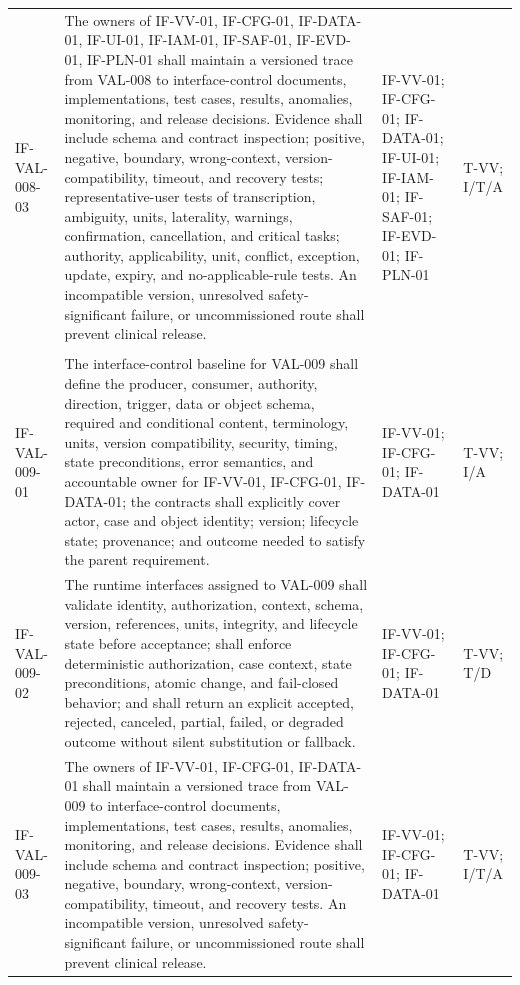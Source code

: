 \documentclass[11pt,letterpaper]{article}
\begin{document}
\begin{scriptsize}
\begin{longtable}{@{}L{0.14\textwidth}L{0.49\textwidth}L{0.19\textwidth}L{0.10\textwidth}@{}}
\addlinespace[2pt]
\mbox{IF-VAL-008-03} & The owners of IF-VV-01, IF-CFG-01, IF-DATA-01, IF-UI-01, IF-IAM-01, IF-SAF-01, IF-EVD-01, IF-PLN-01 shall maintain a versioned trace from VAL-008 to interface-control documents, implementations, test cases, results, anomalies, monitoring, and release decisions. Evidence shall include schema and contract inspection; positive, negative, boundary, wrong-context, version-compatibility, timeout, and recovery tests; representative-user tests of transcription, ambiguity, units, laterality, warnings, confirmation, cancellation, and critical tasks; authority, applicability, unit, conflict, exception, update, expiry, and no-applicable-rule tests. An incompatible version, unresolved safety-significant failure, or uncommissioned route shall prevent clinical release. & IF-VV-01; IF-CFG-01; IF-DATA-01; IF-UI-01; IF-IAM-01; IF-SAF-01; IF-EVD-01; IF-PLN-01 & T-VV; I\slash\allowbreak{}T\slash\allowbreak{}A \\
\addlinespace[2pt]
 \\
\addlinespace[2pt]
\mbox{IF-VAL-009-01} & The interface-control baseline for VAL-009 shall define the producer, consumer, authority, direction, trigger, data or object schema, required and conditional content, terminology, units, version compatibility, security, timing, state preconditions, error semantics, and accountable owner for IF-VV-01, IF-CFG-01, IF-DATA-01; the contracts shall explicitly cover actor, case and object identity; version; lifecycle state; provenance; and outcome needed to satisfy the parent requirement. & IF-VV-01; IF-CFG-01; IF-DATA-01 & T-VV; I\slash\allowbreak{}A \\
\addlinespace[2pt]
\mbox{IF-VAL-009-02} & The runtime interfaces assigned to VAL-009 shall validate identity, authorization, context, schema, version, references, units, integrity, and lifecycle state before acceptance; shall enforce deterministic authorization, case context, state preconditions, atomic change, and fail-closed behavior; and shall return an explicit accepted, rejected, canceled, partial, failed, or degraded outcome without silent substitution or fallback. & IF-VV-01; IF-CFG-01; IF-DATA-01 & T-VV; T\slash\allowbreak{}D \\
\addlinespace[2pt]
\mbox{IF-VAL-009-03} & The owners of IF-VV-01, IF-CFG-01, IF-DATA-01 shall maintain a versioned trace from VAL-009 to interface-control documents, implementations, test cases, results, anomalies, monitoring, and release decisions. Evidence shall include schema and contract inspection; positive, negative, boundary, wrong-context, version-compatibility, timeout, and recovery tests. An incompatible version, unresolved safety-significant failure, or uncommissioned route shall prevent clinical release. & IF-VV-01; IF-CFG-01; IF-DATA-01 & T-VV; I\slash\allowbreak{}T\slash\allowbreak{}A \\

\end{longtable}
\end{scriptsize}
\end{document}
